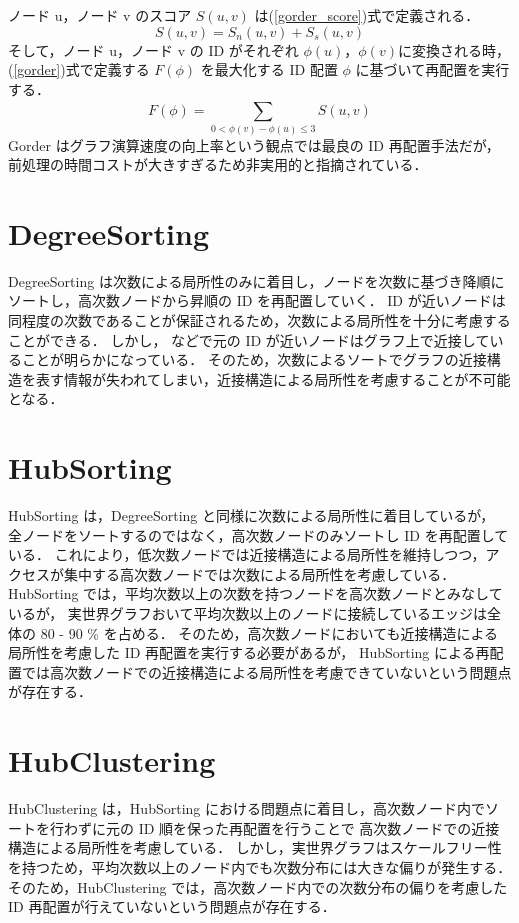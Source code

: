 ノード u，ノード v のスコア $S(u,v)$ は(\ref{gorder_score})式で定義される．
\begin{equation}
  S(u,v) = S_{n}(u,v) + S_{s}(u,v) \label{gorder_score}
\end{equation}
そして，ノード u，ノード v の ID がそれぞれ $\phi(u)$，$\phi(v)$に変換される時，
(\ref{gorder})式で定義する $F(\phi)$ を最大化する ID 配置 $\phi$ に基づいて再配置を実行する．
\begin{equation}
  F(\phi) = \sum_{0<\phi(v)-\phi(u)\leq3}^{} S(u,v) \label{gorder}
\end{equation}
Gorder はグラフ演算速度の向上率という観点では最良の ID 再配置手法だが，前処理の時間コストが大きすぎるため非実用的と指摘されている\cite{balaji2018graph, faldu2019closer}．
\section{DegreeSorting}
DegreeSorting は次数による局所性のみに着目し，ノードを次数に基づき降順にソートし，高次数ノードから昇順の ID を再配置していく．
ID が近いノードは同程度の次数であることが保証されるため，次数による局所性を十分に考慮することができる．
しかし，\cite{balaji2018graph, faldu2019closer} などで元の ID が近いノードはグラフ上で近接していることが明らかになっている．
そのため，次数によるソートでグラフの近接構造を表す情報が失われてしまい，近接構造による局所性を考慮することが不可能となる．
\section{HubSorting}
HubSorting \cite{zhang2017making} は，DegreeSorting と同様に次数による局所性に着目しているが，
全ノードをソートするのではなく，高次数ノードのみソートし ID を再配置している．
これにより，低次数ノードでは近接構造による局所性を維持しつつ，アクセスが集中する高次数ノードでは次数による局所性を考慮している．
HubSorting では，平均次数以上の次数を持つノードを高次数ノードとみなしているが，
実世界グラフおいて平均次数以上のノードに接続しているエッジは全体の 80 - 90 \% を占める\cite{faldu2019closer}．
そのため，高次数ノードにおいても近接構造による局所性を考慮した ID 再配置を実行する必要があるが，
HubSorting による再配置では高次数ノードでの近接構造による局所性を考慮できていないという問題点が存在する．
\section{HubClustering}
HubClustering \cite{balaji2018graph} は，HubSorting における問題点に着目し，高次数ノード内でソートを行わずに元の ID 順を保った再配置を行うことで
高次数ノードでの近接構造による局所性を考慮している．
しかし，実世界グラフはスケールフリー性を持つため，平均次数以上のノード内でも次数分布には大きな偏りが発生する．
そのため，HubClustering では，高次数ノード内での次数分布の偏りを考慮した ID 再配置が行えていないという問題点が存在する．
